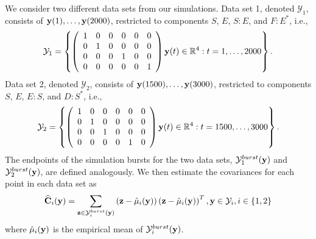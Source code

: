 We consider two different data sets from our simulations.
%
Data set 1, denoted $\mathcal{Y}_1$, consists of $\mathbf{y}(1), \dots, \mathbf{y}(2000)$, restricted to components $S$, $E$, $S:E$, and $F:E^{*}$, i.e.,
$$\mathcal{Y}_1 = \left\{
\left( \begin{array}{cccccc}
1 & 0 & 0 & 0 & 0 & 0 \\
0 & 1 & 0 & 0 & 0 & 0 \\
0 & 0 & 0 & 1 & 0 & 0 \\
0 & 0 & 0 & 0 & 0 & 1
\end{array} \right) \mathbf{y}(t) \in \mathbb{R}^4: t=1, \dots, 2000 \right\}.$$
%
Data set 2, denoted $\mathcal{Y}_2$, consists of $\mathbf{y}(1500), \dots, \mathbf{y}(3000)$, restricted to components $S$, $E$, $E:S$, and $D:S^{*}$, i.e.,
$$\mathcal{Y}_2 = \left\{
\left( \begin{array}{cccccc}
1 & 0 & 0 & 0 & 0 & 0 \\
0 & 1 & 0 & 0 & 0 & 0 \\
0 & 0 & 1 & 0 & 0 & 0 \\
0 & 0 & 0 & 0 & 1 & 0
\end{array} \right)
\mathbf{y}(t) \in \mathbb{R}^4: t=1500, \dots, 3000 \right\}.$$
%
The endpoints of the simulation bursts for the two data sets, $\mathcal{Y}^{burst}_1(\mathbf{y})$ and $\mathcal{Y}^{burst}_2(\mathbf{y})$, are defined analogously.
%
We then estimate the covariances for each point in each data set as
\begin{equation}
\widehat{\mathbf{C}}_i(\mathbf{y}) = \sum_{\mathbf{z} \in \mathcal{Y}^{burst}_i(\mathbf{y})} \left( \mathbf{z} - \hat{\mathbf{\mu}}_i(\mathbf{y}) \right)\left( \mathbf{z} - \hat{\mathbf{\mu}}_i(\mathbf{y}) \right)^T, \mathbf{y} \in \mathcal{Y}_i, i \in \{1, 2\}
\end{equation}
where $\hat{\mathbf{\mu}}_i(\mathbf{y})$ is the empirical mean of $\mathcal{Y}^{burst}_i(\mathbf{y})$.

